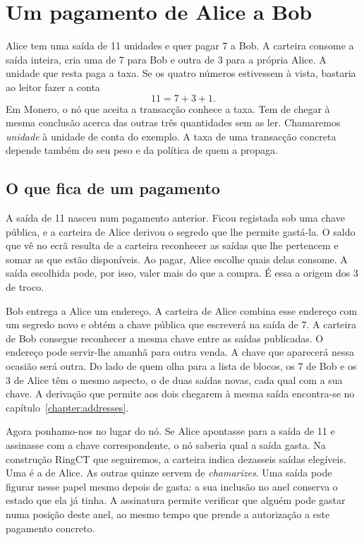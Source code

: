 \chapter{Um pagamento de Alice a Bob}
\label{chapter:introduction}

Alice tem uma saída de 11 unidades e quer pagar 7 a Bob. A carteira
consome a saída inteira, cria uma de 7 para Bob e outra de 3 para a
própria Alice. A unidade que resta paga a taxa. Se os quatro números
estivessem à vista, bastaria ao leitor fazer a conta
\[
                         11=7+3+1 .
\]
Em Monero, o nó que aceita a transacção conhece a taxa. Tem de chegar
à mesma conclusão acerca das outras três quantidades sem as ler.
Chamaremos \emph{unidade} à unidade de conta do exemplo. A taxa de
uma transacção concreta depende também do seu peso e da política de
quem a propaga.

\section{O que fica de um pagamento}

A saída de 11 nasceu num pagamento anterior. Ficou registada sob uma
chave pública, e a carteira de Alice derivou o segredo que lhe permite gastá-la.
O saldo que vê no ecrã resulta de a carteira reconhecer as saídas que
lhe pertencem e somar as que estão disponíveis. Ao pagar, Alice
escolhe quais delas consome. A saída escolhida pode, por isso, valer
mais do que a compra. É essa a origem dos 3 de troco.

Bob entrega a Alice um endereço. A carteira de Alice combina esse
endereço com um segredo novo e obtém a chave pública que escreverá na
saída de 7. A carteira de Bob consegue reconhecer a mesma chave entre
as saídas publicadas. O endereço pode servir-lhe amanhã para outra
venda. A chave que aparecerá nessa ocasião será outra. Do lado de
quem olha para a lista de blocos, os 7 de Bob e os 3 de Alice têm o
mesmo aspecto, o de duas saídas novas, cada qual com a sua chave.
A derivação que permite aos dois chegarem à mesma saída encontra-se
no capítulo~\ref{chapter:addresses}.

Agora ponhamo-nos no lugar do nó. Se Alice apontasse para a saída de
11 e assinasse com a chave correspondente, o nó saberia qual a saída
gasta. Na construção RingCT que seguiremos, a carteira indica dezasseis
saídas elegíveis. Uma é a de Alice. As outras quinze servem de \emph{chamarizes}. Uma saída pode figurar nesse papel mesmo depois de gasta: a sua inclusão no anel conserva o estado que ela já tinha. A assinatura
permite verificar que alguém pode gastar numa posição deste anel, ao
mesmo tempo que prende a autorização a este pagamento concreto.

